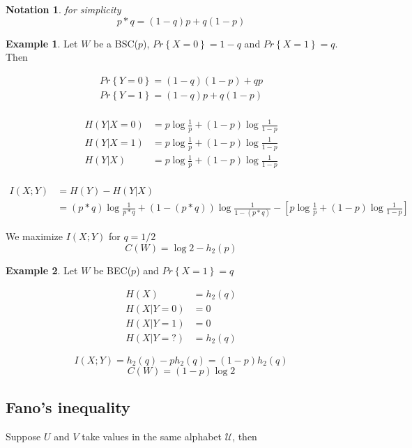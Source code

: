 \documentclass[twoside]{article}
\newtheorem{notation}{Notation}
\theoremstyle{definition} %
\newtheorem{example}{Example}
\renewcommand{\Pr}[1]{Pr\left\{#1\right\}}
\def\U{\mathcal{U}}
\begin{document}
\begin{notation} for simplicity
  \[
    p\ast q = (1-q)p + q(1-p)
  \]
\end{notation}

\begin{example}
  Let $W$ be a BSC($p$), $\Pr{X=0} = 1 - q$ and $\Pr{X=1} = q$. Then

  \begin{align*}
    \Pr{Y=0} = (1-q)(1-p) + qp\\
    \Pr{Y=1} = (1-q)p + q(1-p)\\
  \end{align*}

  \begin{align*}
    H(Y|X=0) &= p \log \frac 1 p + (1-p) \log \frac 1 {1-p}\\
    H(Y|X=1) &= p \log \frac 1 p + (1-p) \log \frac 1 {1-p}\\
    H(Y|X) &= p \log \frac 1 p + (1-p) \log \frac 1 {1-p}\\
  \end{align*}

  \begin{align*}
    I(X;Y) &= H(Y) - H(Y|X)\\
    &=(p\ast q) \log \frac 1 {p\ast q} + (1-(p\ast q))\log \frac 1 {1-(p\ast q)}
    -
    \left[
    p \log \frac 1 p + (1-p) \log \frac 1 {1-p}
    \right]
  \end{align*}

  We maximize $I(X;Y)$ for $q=1/2$
  \[
    C(W) = \log 2 - h_2(p)
  \]

\end{example}

\begin{example}
  Let $W$ be BEC($p$) and $\Pr{X=1} = q$

  \begin{align*}
    H(X) &= h_2(q)
\\    H(X|Y=0) &= 0\\
    H(X|Y=1) &= 0\\
    H(X|Y=?) &= h_2(q)
  \end{align*}

  \[
    I(X;Y) = h_2(q) - ph_2(q) = (1-p)h_2(q)
  \]
  \[
    C(W) = (1-p)\log 2
  \]
\end{example}


\subsection{Fano's inequality}
Suppose $U$ and $V$ take values in the same alphabet $\U$, then
\end{document}
